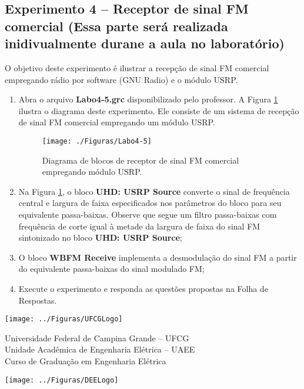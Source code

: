 \documentclass[12pt,addpoints]{exam}
\begin{document}
\subsection{Experimento 4 -- Receptor de sinal FM comercial (Essa parte será realizada inidivualmente durane a  aula no laboratório)}

O objetivo deste experimento é ilustrar a recepção de sinal FM comercial empregando rádio por software (GNU Radio) e o módulo USRP.

\begin{enumerate}
    \item  Abra o arquivo \textbf{Labo4-5.grc} disponibilizado pelo professor. A Figura \ref{fig:GRC_4-5} ilustra o diagrama deste experimento. Ele consiste de um sistema de recepção de sinal FM comercial empregando um módulo USRP. 
    \begin{figure}[htb]
        \centering
        \texttt{[image: ./Figuras/Labo4-5]}
        \caption{Diagrama de blocos de receptor de sinal FM comercial empregando módulo USRP.} 
        \label{fig:GRC_4-5}
    \end{figure}
    \item Na Figura \ref{fig:GRC_4-5}, o bloco \textbf{UHD: USRP Source} converte o sinal de frequência central e largura de faixa especificados nos parâmetros do bloco para seu equivalente passa-baixas. Observe que segue um filtro passa-baixas com frequência de corte igual à metade da largura de faixa do sinal FM sintonizado no bloco \textbf{UHD: USRP Source};
    \item O bloco \textbf{WBFM Receive} implementa a desmodulação do sinal FM a partir do equivalente passa-baixas do sinal modulado FM;
    \item Execute o experimento e responda as questões propostas na Folha de Respostas.
\end{enumerate}

\newpage {}

\noindent \texttt{[image: ../Figuras/UFCGLogo]} \hfill
\begin{minipage}{.66\textwidth} \large \centering \vspace{-1.8cm}
    Universidade Federal de Campina Grande -- UFCG \\
    Unidade Acadêmica de Engenharia Elétrica -- UAEE \\
    Curso de Graduação em Engenharia Elétrica
\end{minipage}
\hfill \texttt{[image: ../Figuras/DEELogo]} \\[12pt]
\end{document}
